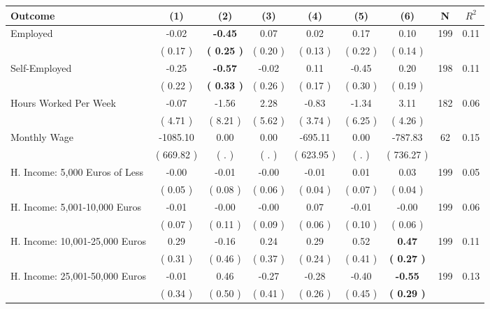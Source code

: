 \begin{tabular}{lcccccccc}
\toprule
 \textbf{Outcome} & \textbf{(1)} & \textbf{(2)} & \textbf{(3)} & \textbf{(4)} & \textbf{(5)} & \textbf{(6)} & \textbf{N} & \textbf{$ R^2$} \\
\midrule
Employed &     -0.02 & \textbf{    -0.45} &      0.07 &      0.02 &      0.17 &      0.10 & 199 &       0.11 \\ 
 & (     0.17 ) & \textbf{(     0.25 )} & (     0.20 ) & (     0.13 ) & (     0.22 ) & (     0.14 ) & \\
Self-Employed &     -0.25 & \textbf{    -0.57} &     -0.02 &      0.11 &     -0.45 &      0.20 & 198 &       0.11 \\ 
 & (     0.22 ) & \textbf{(     0.33 )} & (     0.26 ) & (     0.17 ) & (     0.30 ) & (     0.19 ) & \\
Hours Worked Per Week &     -0.07 &     -1.56 &      2.28 &     -0.83 &     -1.34 &      3.11 & 182 &       0.06 \\ 
 & (     4.71 ) & (     8.21 ) & (     5.62 ) & (     3.74 ) & (     6.25 ) & (     4.26 ) & \\
Monthly Wage &  -1085.10 &      0.00 &      0.00 &   -695.11 &      0.00 &   -787.83 & 62 &       0.15 \\ 
 & (   669.82 ) & (        . ) & (        . ) & (   623.95 ) & (        . ) & (   736.27 ) & \\
H. Income: 5,000 Euros of Less &     -0.00 &     -0.01 &     -0.00 &     -0.01 &      0.01 &      0.03 & 199 &       0.05 \\ 
 & (     0.05 ) & (     0.08 ) & (     0.06 ) & (     0.04 ) & (     0.07 ) & (     0.04 ) & \\
H. Income: 5,001-10,000 Euros &     -0.01 &     -0.00 &     -0.00 &      0.07 &     -0.01 &     -0.00 & 199 &       0.06 \\ 
 & (     0.07 ) & (     0.11 ) & (     0.09 ) & (     0.06 ) & (     0.10 ) & (     0.06 ) & \\
H. Income: 10,001-25,000 Euros &      0.29 &     -0.16 &      0.24 &      0.29 &      0.52 & \textbf{     0.47} & 199 &       0.11 \\ 
 & (     0.31 ) & (     0.46 ) & (     0.37 ) & (     0.24 ) & (     0.41 ) & \textbf{(     0.27 )} & \\
H. Income: 25,001-50,000 Euros &     -0.01 &      0.46 &     -0.27 &     -0.28 &     -0.40 & \textbf{    -0.55} & 199 &       0.13 \\ 
 & (     0.34 ) & (     0.50 ) & (     0.41 ) & (     0.26 ) & (     0.45 ) & \textbf{(     0.29 )} & \\

\end{tabular}
